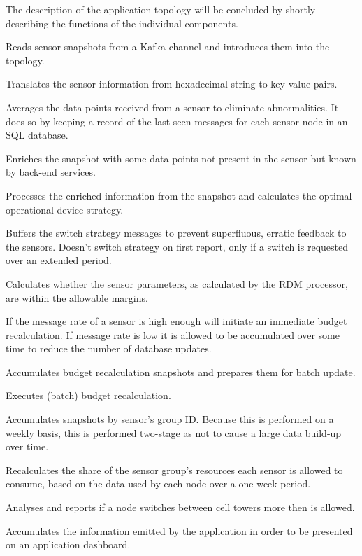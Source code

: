 The description of the application topology will be concluded by shortly describing the functions of the individual components.
\begin{description}[style=nextline]
\nospace
\item[Sensit spout] Reads sensor snapshots from a Kafka channel and introduces them into the topology.
\item[Translator] Translates the sensor information from hexadecimal string to key-value pairs.
\item[Nuancer] Averages the data points received from a sensor to eliminate abnormalities. It does so by keeping a record of the last seen messages for each sensor node in an SQL database.
\item[Attributor] Enriches the snapshot with some data points not present in the sensor but known by  back-end services.
\item[Sensor RDM processor] Processes the enriched information from the snapshot and calculates the optimal operational device strategy.
\item[Switch RUM buffer] Buffers the switch strategy messages to prevent superfluous, erratic feedback to the sensors. Doesn't switch strategy on first report, only if a switch is requested over an extended period.
\item[Single message analyser] Calculates whether the sensor parameters, as calculated by the RDM processor, are within the allowable margins.
\item[Budget recalculator interface]If the message rate of a sensor is high enough will initiate an immediate budget recalculation. If message rate is low it is allowed to be accumulated over some time to reduce the number of database updates.
\item[Budget recalculator accumulator] Accumulates budget recalculation snapshots and prepares them for batch update.
\item[Budget recalculator] Executes (batch) budget recalculation.
\item[Group accumulator] Accumulates snapshots by sensor's group ID. Because this is performed on a weekly basis, this is performed two-stage as not to cause a large data build-up over time.
\item[Group share recalculator] Recalculates the share of the sensor group's resources each sensor is allowed to consume, based on the data used by each node over a one week period.
\item[Cell switch analyser] Analyses and reports if a node switches between cell towers more then is allowed.
\item[Application accumulator] Accumulates the information emitted by the application in order to be presented on an application dashboard.
\end{description}

